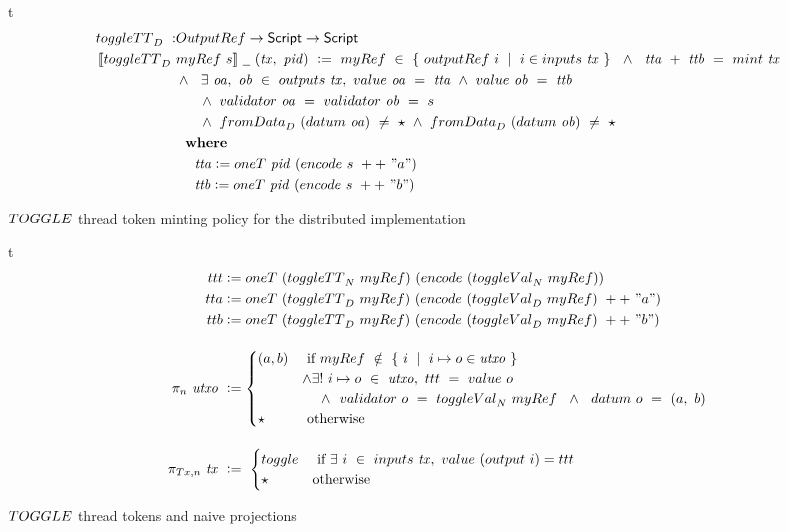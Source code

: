 \begin{ruledfigure}{t}
  \begin{align*}
    \toggleTT_D~:& \OutputRef \to \Script \to \Script \\
    \applyMPScript{\toggleTT_D~&\mathsf{myRef}~s}~\wcard~(\var{tx},~\var{pid})~\leteq ~
    \fun{myRef}~\in~ \{ ~\outputref~i~\mid~i \in \inputs~\var{tx}~\} ~~ \wedge ~~ \var{tta} ~+~ \var{ttb} ~=~ \mint~\var{tx} \\
    & \wedge  ~~\exists~\var{oa},~\var{ob}~\in~\fun{outputs}~\var{tx}, ~\val~\var{oa}~=~\var{tta}~ \wedge ~\val~\var{ob}~=~\var{ttb}~\\
    & ~~~~~\wedge ~\validator~\var{oa}~=~\validator~\var{ob}~=~s \\
    & ~~~~~\wedge ~\fun{fromData}_D~(\datum~\var{oa})~\neq~\emptytype~ \wedge~\fun{fromData}_D~(\datum~\var{ob})~\neq~\emptytype~~ \\
    & \where \\
    & ~~~~\var{tta} \leteq \mathsf{oneT}~\var{pid}~(\fun{encode}~s~++~ "a") \\
    & ~~~~\var{ttb} \leteq \mathsf{oneT}~\var{pid}~(\fun{encode}~s~++~"b")
  \end{align*}
\caption{$\TOGGLE$ thread token minting policy for the distributed implementation}
\label{fig:toggle-tt-d}
\end{ruledfigure}


\begin{ruledfigure}{t}
  \begin{align*}
    \fun{ttt} & \leteq \mathsf{oneT}~(\toggleTT_N~\mathsf{myRef})~(\fun{encode}~(\toggleVal_N~\mathsf{myRef})) \\
    \fun{tta} &\leteq \mathsf{oneT}~(\toggleTT_D~\mathsf{myRef})~(\fun{encode}~(\toggleVal_D~\mathsf{myRef})~++~ "a") \\
    \fun{ttb} &\leteq \mathsf{oneT}~(\toggleTT_D~\mathsf{myRef})~(\fun{encode}~(\toggleVal_D~\mathsf{myRef})~++~ "b")
    \nextdef
    \pi_{n}~\var{utxo}~& \leteq \begin{cases}
      (a, b) & \text{ if } \mathsf{myRef}~\notin~\{ ~i~\mid~i\mapsto o \in  \var{utxo}~\} \\
      & \wedge \exists ! ~i\mapsto o~\in~\var{utxo},~\fun{ttt}~=~\val~o~ \\
      & ~~~~ \wedge~~\validator~o~=~\toggleVal_N~\mathsf{myRef}~~\wedge~~\datum~o~=~(a,~b) \\
      \emptytype & \text{ otherwise}
    \end{cases}
    \nextdef
    \pi_{\Tx,n}~\var{tx}~& \leteq~\begin{cases}
      \toggle & \text{ if } \exists~i~ \in~\inputs~\var{tx},~\val~(\fun{output}~i) = \fun{ttt} \\
      \emptytype & \text{otherwise}
    \end{cases}
  \end{align*}
\caption{$\TOGGLE$ thread tokens and naive projections}
\label{fig:toggle-sim-n}
\end{ruledfigure}

